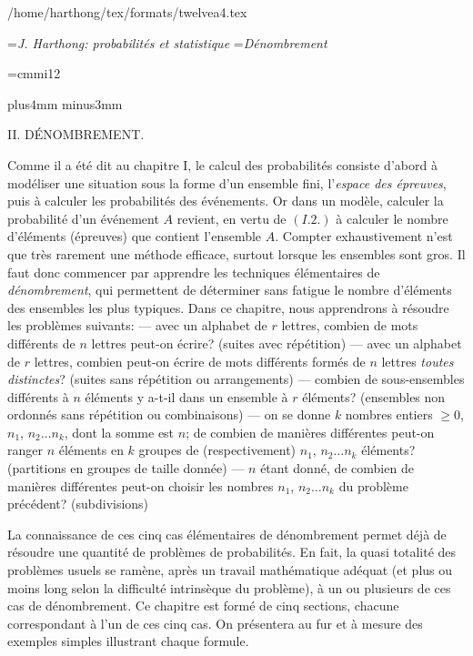 
/home/harthong/tex/formats/twelvea4.tex

\auteurcourant={\sl J. Harthong: probabilit\'es et statistique}
\titrecourant={\sl D\'enombrement}

\font\twelvemi=cmmi12 
\def\struta{\vrule depth2.4pt width0pt} 
\def\strutb{\vrule depth4.8pt width0pt} 
\def\strutc{\vrule depth3.6pt width0pt} 

 
\null\vskip10mm plus4mm minus3mm 
 
\centerline{\tit II. D\'ENOMBREMENT.} 
\vskip10mm 
 
Comme il a \'et\'e dit au chapitre I, le calcul des probabilit\'es  
consiste d'abord \`a mod\'eliser une situation sous la forme d'un 
ensemble fini,  l'{\it espace des \'epreuves}, puis \`a calculer les 
probabilit\'es des \'ev\'enements. Or dans un mod\`ele, calculer la 
probabilit\'e d'un \'ev\'enement $A$ revient, en vertu de $(I.2.)$ \`a 
calculer le nombre d'\'el\'ements (\'epreuves) que contient l'ensemble 
$A$. Compter exhaustivement n'est que tr\`es rarement une m\'ethode 
efficace,  surtout lorsque les ensembles sont gros. Il faut donc 
commencer par apprendre les techniques \'el\'ementaires de {\it 
d\'enombrement}, qui permettent de d\'eterminer sans fatigue le 
nombre d'\'el\'ements des ensembles les plus ty\-pi\-ques. Dans ce 
chapitre, nous apprendrons \`a r\'esoudre les probl\`emes sui\-vants:  
\smallskip 
--- avec un alphabet de $r$ lettres, combien de mots diff\'erents de  
$n$ lettres peut-on \'ecrire? (suites avec r\'ep\'etition) 
\smallskip 
--- avec un alphabet de $r$ lettres, combien peut-on \'ecrire de mots  
diff\'erents form\'es de $n$ lettres {\it toutes distinctes}? (suites  
sans r\'ep\'etition ou arrangements)  
\smallskip 
--- combien de sous-ensembles diff\'erents \`a $n$ \'el\'ements y a-t-il 
dans un ensemble \`a  $r$  \'el\'ements? (ensembles non ordonn\'es sans 
r\'ep\'etition ou combinaisons) 
\smallskip 
--- on se donne $k$ nombres entiers $\geq 0$, $n_1$, $n_2 \ldots n_k$, 
dont la somme est $n$; de combien de mani\`eres diff\'erentes peut-on  
ranger $n$ \'el\'ements en $k$ groupes de (respectivement) $n_1$, $n_2 
\ldots n_k$ \'el\'ements? (partitions en groupes de taille donn\'ee) 
\smallskip 
--- $n$ \'etant donn\'e, de combien de mani\`eres diff\'erentes peut-on  
choisir les nombres $n_1$, $n_2 \ldots n_k$ du probl\`eme pr\'ec\'edent? 
(subdivisions) 
 
\medskip 
La connaissance de ces cinq cas \'el\'ementaires de d\'enombrement  
permet d\'ej\`a de r\'esoudre une quantit\'e de probl\`emes de 
probabilit\'es. En fait, la quasi totalit\'e des probl\`emes usuels se 
ram\`ene, apr\`es un travail math\'ematique ad\'equat (et plus ou moins 
long selon  la difficult\'e intrins\`eque du probl\`eme), \`a un ou 
plusieurs de ces cas de d\'enombrement.  
\medskip 
Ce chapitre est form\'e de cinq sections, chacune correspondant \`a 
l'un de ces cinq cas. On pr\'esentera au fur et \`a mesure des exemples 
simples illustrant  chaque formule. 
 
